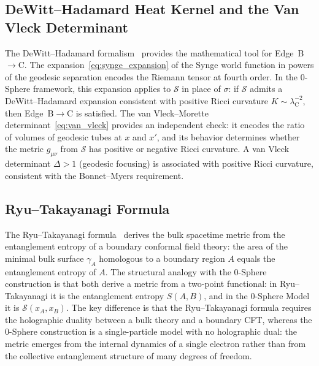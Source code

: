 \documentclass[%
 reprint, amsmath,amssymb, aps, prd, ]{revtex4-2}
\numberwithin{equation}{section}
\newcommand{\lambdaC}{\lambda_{\mathrm{C}}}
\newcommand{\SyngeS}{\mathcal{S}}
\begin{document}
\subsection{DeWitt--Hadamard Heat Kernel and the Van Vleck Determinant}

The DeWitt--Hadamard formalism~\cite{DeWitt1965,Hadamard1923} provides the mathematical tool for Edge~B$\to$C.
The expansion~\eqref{eq:synge_expansion} of the Synge world function in powers of the geodesic separation encodes the Riemann tensor at fourth order.
In the 0-Sphere framework, this expansion applies to $\SyngeS$ in place of $\sigma$: if $\SyngeS$ admits a DeWitt--Hadamard expansion consistent with positive Ricci curvature $K \sim \lambdaC^{-2}$, then Edge~B$\to$C is satisfied.
The van Vleck--Morette determinant~\eqref{eq:van_vleck} provides an independent check: it encodes the ratio of volumes of geodesic tubes at $x$ and $x'$, and its behavior determines whether the metric $g_{\mu\nu}$ from $\SyngeS$ has positive or negative Ricci curvature.
A van Vleck determinant $\Delta > 1$ (geodesic focusing) is associated with positive Ricci curvature, consistent with the Bonnet--Myers requirement.

\subsection{Ryu--Takayanagi Formula}

The Ryu--Takayanagi formula~\cite{RyuTakayanagi2006} derives the bulk spacetime metric from the entanglement entropy of a boundary conformal field theory: the area of the minimal bulk surface $\gamma_A$ homologous to a boundary region $A$ equals the entanglement entropy of $A$.
The structural analogy with the 0-Sphere construction is that both derive a metric from a two-point functional: in Ryu--Takayanagi it is the entanglement entropy $S(A,B)$, and in the 0-Sphere Model it is $\SyngeS(x_A,x_B)$.
The key difference is that the Ryu--Takayanagi formula requires the holographic duality between a bulk theory and a boundary CFT, whereas the 0-Sphere construction is a single-particle model with no holographic dual: the metric emerges from the internal dynamics of a single electron rather than from the collective entanglement structure of many degrees of freedom.
\end{document}

